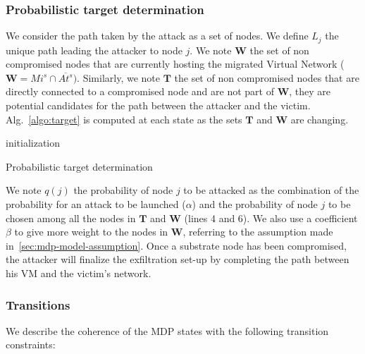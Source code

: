 \subsubsection{Probabilistic target determination}
\label{sec:target_proba}
We consider the path taken by the attack as a set of nodes.
We define $L_j$ the unique path leading the attacker to node $j$.
We note $\textbf{W}$ the set of non compromised nodes that are currently hosting the migrated Virtual Network (\ie $\textbf{W} = Mi^s \cap \overline{At^s})$.
Similarly, we note $\textbf{T}$ the set of non compromised nodes that are directly connected to a compromised node and are not part of $\textbf{W}$, \ie they are potential candidates for the path between the attacker and the victim. Alg.~\ref{algo:target} is computed at each state as the sets $\textbf{T}$ and $\textbf{W}$ are changing.
\begin{algorithm}
 initialization\;
 \caption{Probabilistic target determination}
 \label{algo:target}
\end{algorithm}


We note $q(j)$ the probability of node $j$ to be attacked as the combination of the probability for an attack to be launched (\ie $\alpha$) and the probability of node $j$ to be chosen among all the nodes in $\textbf{T}$ and $\textbf{W}$ (lines 4 and 6). We also use a coefficient $\beta$ to give more weight to the nodes in $\textbf{W}$, referring to the assumption made in~\ref{sec:mdp-model-assumption}.
Once a substrate node has been compromised, the attacker will finalize the exfiltration set-up by completing the path between his VM and the victim's network.


\subsubsection{Transitions}
We describe the coherence of the MDP states with the following transition constraints:

